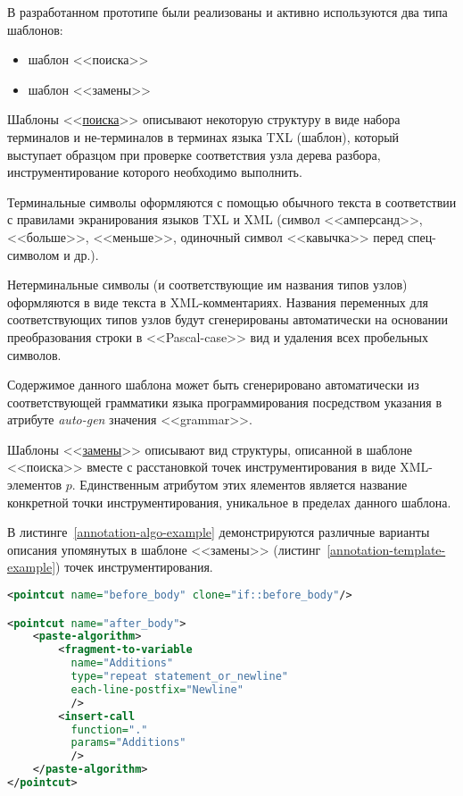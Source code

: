В разработанном прототипе были реализованы и активно используются два типа шаблонов:
\begin{itemize}[noitemsep]
  \item шаблон <<поиска>>
  \item шаблон <<замены>>
\end{itemize}

Шаблоны <<\underline{поиска}>> описывают некоторую структуру в виде набора терминалов и не-терминалов в терминах языка TXL (шаблон), который выступает образцом при проверке соответствия узла дерева разбора, инструментирование которого необходимо выполнить.

Терминальные символы оформляются с помощью обычного текста в соответствии с правилами экранирования языков TXL и XML (символ <<амперсанд>>, <<больше>>, <<меньше>>, одиночный символ <<кавычка>> перед спец-символом и др.).

Нетерминальные символы (и соответствующие им названия типов узлов) оформляются в виде текста в XML-комментариях.
Названия переменных для соответствующих типов узлов будут сгенерированы автоматически на основании преобразования строки в <<Pascal-case>> вид и удаления всех пробельных символов.

Содержимое данного шаблона может быть сгенерировано автоматически из соответствующей грамматики языка программирования посредством указания в атрибуте \textit{auto-gen} значения <<grammar>>.

Шаблоны <<\underline{замены}>> описывают вид структуры, описанной в шаблоне <<поиска>> вместе с расстановкой точек инструментирования в виде XML-элементов $p$.
Единственным атрибутом этих ялементов является название конкретной точки инструментирования, уникальное в пределах данного шаблона.

В листинге~\ref{annotation-algo-example} демонстрируются различные варианты описания упомянутых в шаблоне <<замены>> (листинг~\ref{annotation-template-example}) точек инструментирования.

\begin{lstlisting}[frame=single, language=XML, label={annotation-algo-example}, caption={Пример описания алгоритмов для точек инструментирования.}]
<pointcut name="before_body" clone="if::before_body"/>

<pointcut name="after_body">
    <paste-algorithm>
        <fragment-to-variable
          name="Additions"
          type="repeat statement_or_newline"
          each-line-postfix="Newline"
          />
        <insert-call
          function="."
          params="Additions"
          />
    </paste-algorithm>
</pointcut>
\end{lstlisting}

